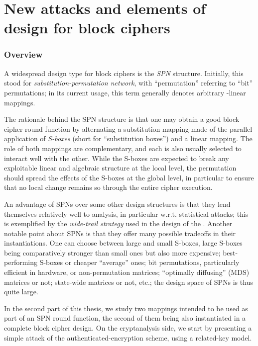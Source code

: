 \part[Nouvelles attaques et constructions pour chiffres par bloc]
	{New attacks and elements of design for block ciphers}
\label{part:constructions}

\section*{Overview}

A widespread design type for block ciphers is the \emph{SPN} structure. Initially, this stood for \emph{substitution-permutation network},
with ``permutation'' referring to ``bit'' permutations; in its current usage, this term generally denotes arbitrary \ftwo-linear
mappings.

The rationale behind the SPN structure is that one may obtain a good block cipher round function by alternating a substitution
mapping made of the parallel application of \emph{S-boxes} (short for ``substitution boxes'') and a linear mapping. The role
of both mappings are complementary, and each is also usually selected to interact well with the other. While the S-boxes
are expected to break any exploitable linear and algebraic structure at the local level, the permutation
should spread the effects of the S-boxes at the global level, in particular to ensure that no local change remains so through
the entire cipher execution.

An advantage of SPNs over some other design structures is that they lend themselves relatively well to analysis, in particular w.r.t.
statistical attacks; this is exemplified by the \emph{wide-trail strategy} used in the design of the \aes. Another notable point
about SPNs is that they offer many possible tradeoffs in their instantiations. One can choose between large and small S-boxes,
large S-boxes being comparatively stronger than small ones but also more expensive; best-performing S-boxes or cheaper
``average'' ones; bit permutations, particularly efficient in hardware, or non-permutation matrices; ``optimally diffusing'' (MDS)
matrices or not; state-wide matrices or not, etc.; the design space of SPNs is thus quite large.

\bigskip

In the second part of this thesis, we study two mappings intended to be used as part of an SPN round function, the second
of them being also instantiated in a complete block cipher design. On the cryptanalysis side, we start by presenting a simple attack of the
\proestotr authenticated-encryption scheme, using a related-key model.

